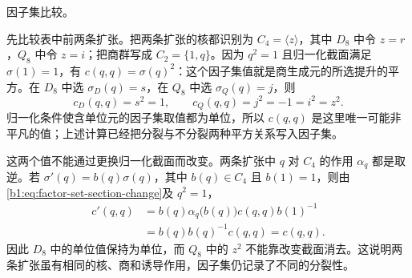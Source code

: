 \hypertarget{b1:factor-comparison-deep}{因子集比较。} 先比较表中前两条扩张。把两条扩张的核都识别为 \(C_4=\langle z\rangle\)，其中 \(D_8\) 中令 \(z=r\)，\(Q_8\) 中令 \(z=i\)；把商群写成 \(C_2=\{1,q\}\)。因为 \(q^2=1\) 且归一化截面满足 \(\sigma(1)=1\)，有 \(c(q,q)=\sigma(q)^2\)：这个因子集值就是商生成元的所选提升的平方。在 \(D_8\) 中选 \(\sigma_D(q)=s\)，在 \(Q_8\) 中选 \(\sigma_Q(q)=j\)，则
\[
	c_D(q,q)=s^2=1, \qquad c_Q(q,q)=j^2=-1=i^2=z^2.
\]
归一化条件使含单位元的因子集取值都为单位，所以 \(c(q,q)\) 是这里唯一可能非平凡的值；上述计算已经把分裂与不分裂两种平方关系写入因子集。

\ProseParagraphBreak
这两个值不能通过更换归一化截面而改变。两条扩张中 \(q\) 对 \(C_4\) 的作用 \(\alpha_q\) 都是取逆。若 \(\sigma'(q)=b(q)\sigma(q)\)，其中 \(b(q)\in C_4\) 且 \(b(1)=1\)，则由\eqref{b1:eq:factor-set-section-change}及 \(q^2=1\)，
\[
	\begin{aligned}
		c'(q,q) &=b(q)\alpha_q\bigl(b(q)\bigr)c(q,q)b(1)^{-1}\\
		&=b(q)b(q)^{-1}c(q,q)=c(q,q).
	\end{aligned}
\]
因此 \(D_8\) 中的单位值保持为单位，而 \(Q_8\) 中的 \(z^2\) 不能靠改变截面消去。这说明两条扩张虽有相同的核、商和诱导作用，因子集仍记录了不同的分裂性。

